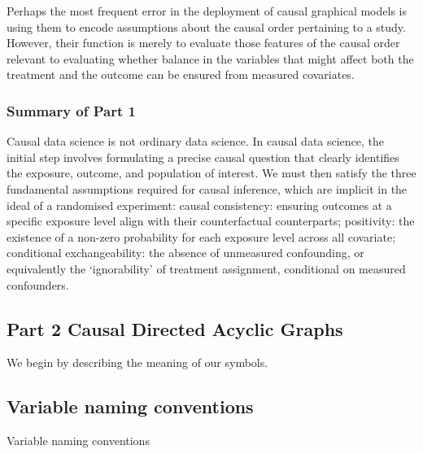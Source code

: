 \documentclass[
  single column]{article}
\begin{document}
Perhaps the most frequent error in the deployment of causal graphical
models is using them to encode assumptions about the causal order
pertaining to a study. However, their function is merely to evaluate
those features of the causal order relevant to evaluating whether
balance in the variables that might affect both the treatment and the
outcome can be ensured from measured covariates.

\subsubsection{Summary of Part 1}\label{summary-of-part-1}

Causal data science is not ordinary data science. In causal data
science, the initial step involves formulating a precise causal question
that clearly identifies the exposure, outcome, and population of
interest. We must then satisfy the three fundamental assumptions
required for causal inference, which are implicit in the ideal of a
randomised experiment: causal consistency: ensuring outcomes at a
specific exposure level align with their counterfactual counterparts;
positivity: the existence of a non-zero probability for each exposure
level across all covariate; conditional exchangeability: the absence of
unmeasured confounding, or equivalently the `ignorability' of treatment
assignment, conditional on measured confounders.

\newpage{}

\subsection{Part 2 Causal Directed Acyclic
Graphs}\label{part-2-causal-directed-acyclic-graphs}

We begin by describing the meaning of our symbols.

\subsection{Variable naming
conventions}\label{variable-naming-conventions}

\begin{table}

\caption{\label{tbl-terminology}Variable naming conventions}

\centering{

\terminologylocalconventionssimple

}

\end{table}%
\end{document}
